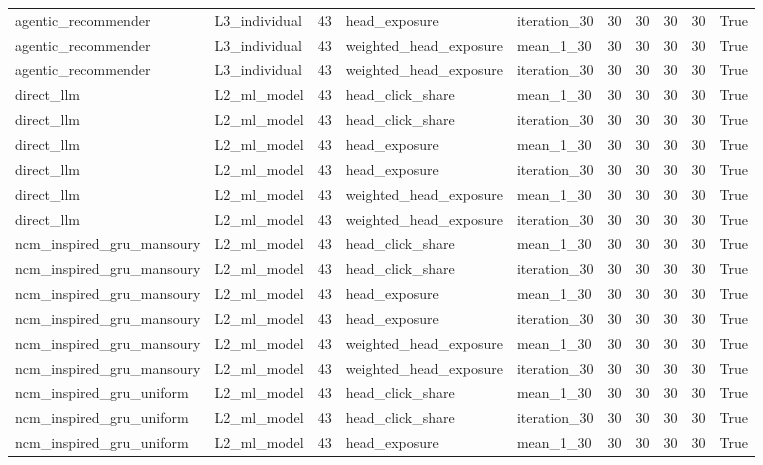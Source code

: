 \begin{table}[htbp!]
\begin{tabular}{llrllrrrrr}
agentic\_recommender & L3\_individual & 43 & head\_exposure & iteration\_30 & 30 & 30 & 30 & 30 & True \\
agentic\_recommender & L3\_individual & 43 & weighted\_head\_exposure & mean\_1\_30 & 30 & 30 & 30 & 30 & True \\
agentic\_recommender & L3\_individual & 43 & weighted\_head\_exposure & iteration\_30 & 30 & 30 & 30 & 30 & True \\
direct\_llm & L2\_ml\_model & 43 & head\_click\_share & mean\_1\_30 & 30 & 30 & 30 & 30 & True \\
direct\_llm & L2\_ml\_model & 43 & head\_click\_share & iteration\_30 & 30 & 30 & 30 & 30 & True \\
direct\_llm & L2\_ml\_model & 43 & head\_exposure & mean\_1\_30 & 30 & 30 & 30 & 30 & True \\
direct\_llm & L2\_ml\_model & 43 & head\_exposure & iteration\_30 & 30 & 30 & 30 & 30 & True \\
direct\_llm & L2\_ml\_model & 43 & weighted\_head\_exposure & mean\_1\_30 & 30 & 30 & 30 & 30 & True \\
direct\_llm & L2\_ml\_model & 43 & weighted\_head\_exposure & iteration\_30 & 30 & 30 & 30 & 30 & True \\
ncm\_inspired\_gru\_mansoury & L2\_ml\_model & 43 & head\_click\_share & mean\_1\_30 & 30 & 30 & 30 & 30 & True \\
ncm\_inspired\_gru\_mansoury & L2\_ml\_model & 43 & head\_click\_share & iteration\_30 & 30 & 30 & 30 & 30 & True \\
ncm\_inspired\_gru\_mansoury & L2\_ml\_model & 43 & head\_exposure & mean\_1\_30 & 30 & 30 & 30 & 30 & True \\
ncm\_inspired\_gru\_mansoury & L2\_ml\_model & 43 & head\_exposure & iteration\_30 & 30 & 30 & 30 & 30 & True \\
ncm\_inspired\_gru\_mansoury & L2\_ml\_model & 43 & weighted\_head\_exposure & mean\_1\_30 & 30 & 30 & 30 & 30 & True \\
ncm\_inspired\_gru\_mansoury & L2\_ml\_model & 43 & weighted\_head\_exposure & iteration\_30 & 30 & 30 & 30 & 30 & True \\
ncm\_inspired\_gru\_uniform & L2\_ml\_model & 43 & head\_click\_share & mean\_1\_30 & 30 & 30 & 30 & 30 & True \\
ncm\_inspired\_gru\_uniform & L2\_ml\_model & 43 & head\_click\_share & iteration\_30 & 30 & 30 & 30 & 30 & True \\
ncm\_inspired\_gru\_uniform & L2\_ml\_model & 43 & head\_exposure & mean\_1\_30 & 30 & 30 & 30 & 30 & True \\

\end{tabular}
\end{table}
